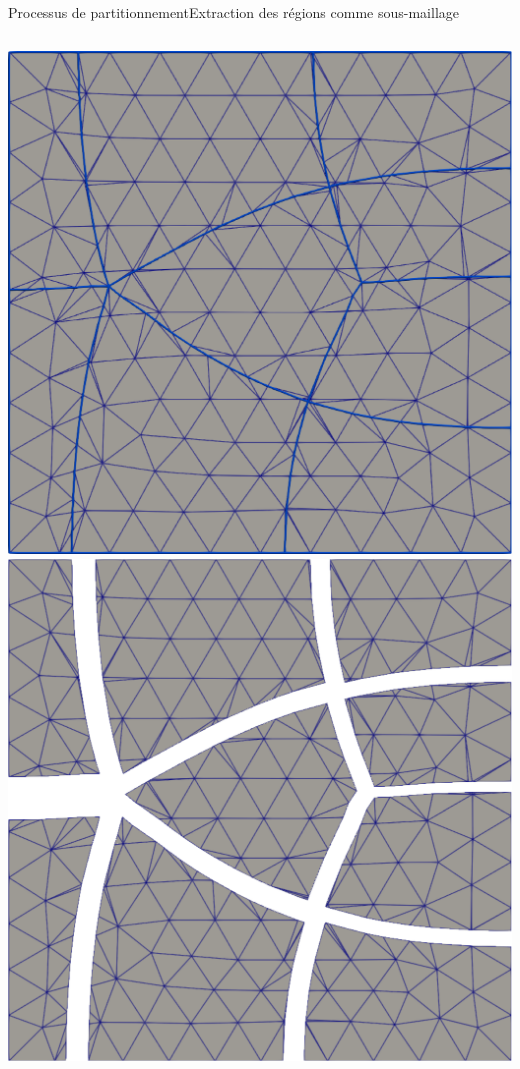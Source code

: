 \documentclass[compress,10pt,aspectratio=169]{beamer}
\begin{document}
\begin{frame}{Processus de partitionnement}{Extraction des régions comme sous-maillage}
\begin{columns}

\begin{column}{0.7\textwidth}
\centering
\includegraphics[scale=0.14]{images/eclatement_2.pdf}
\hspace{0.3cm}
\includegraphics[scale=0.17]{images/eclatement_3.pdf}
\end{column}


\end{columns}
\end{frame}
\end{document}
